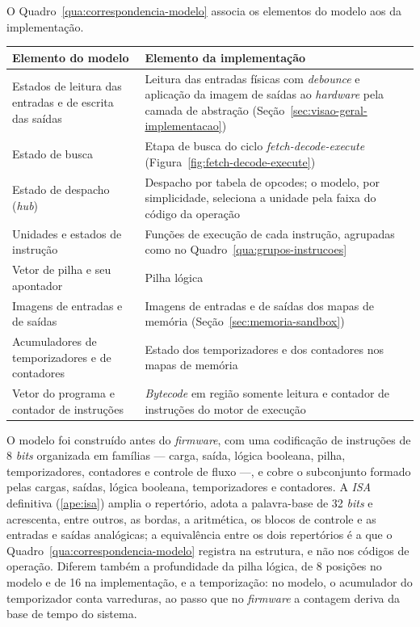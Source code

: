 O Quadro~\ref{qua:correspondencia-modelo} associa os elementos do modelo aos da implementação.

\begin{quadrofixo}
    \centering
    \small
    \begin{tabular}{|p{5.6cm}|p{8.6cm}|}
        \hline
        Elemento do modelo & Elemento da implementação \\
        \hline
        Estados de leitura das entradas e de escrita das saídas & Leitura das entradas físicas com \textit{debounce} e aplicação da imagem de saídas ao \textit{hardware} pela camada de abstração (Seção~\ref{sec:visao-geral-implementacao}) \\
        \hline
        Estado de busca & Etapa de busca do ciclo \textit{fetch-decode-execute} (Figura~\ref{fig:fetch-decode-execute}) \\
        \hline
        Estado de despacho (\textit{hub}) & Despacho por tabela de opcodes; o modelo, por simplicidade, seleciona a unidade pela faixa do código da operação \\
        \hline
        Unidades e estados de instrução & Funções de execução de cada instrução, agrupadas como no Quadro~\ref{qua:grupos-instrucoes} \\
        \hline
        Vetor de pilha e seu apontador & Pilha lógica \\
        \hline
        Imagens de entradas e de saídas & Imagens de entradas e de saídas dos mapas de memória (Seção~\ref{sec:memoria-sandbox}) \\
        \hline
        Acumuladores de temporizadores e de contadores & Estado dos temporizadores e dos contadores nos mapas de memória \\
        \hline
        Vetor do programa e contador de instruções & \textit{Bytecode} em região somente leitura e contador de instruções do motor de execução \\
        \hline
    \end{tabular}

    \label{qua:correspondencia-modelo}
\end{quadrofixo}

O modelo foi construído antes do \textit{firmware}, com uma codificação de instruções de 8 \textit{bits} organizada em famílias --- carga, saída, lógica booleana, pilha, temporizadores, contadores e controle de fluxo ---, e cobre o subconjunto formado pelas cargas, saídas, lógica booleana, temporizadores e contadores.
A \textit{ISA} definitiva (\ref{ape:isa}) amplia o repertório, adota a palavra-base de 32 \textit{bits} e acrescenta, entre outros, as bordas, a aritmética, os blocos de controle e as entradas e saídas analógicas; a equivalência entre os dois repertórios é a que o Quadro~\ref{qua:correspondencia-modelo} registra na estrutura, e não nos códigos de operação.
Diferem também a profundidade da pilha lógica, de 8 posições no modelo e de 16 na implementação, e a temporização: no modelo, o acumulador do temporizador conta varreduras, ao passo que no \textit{firmware} a contagem deriva da base de tempo do sistema.

